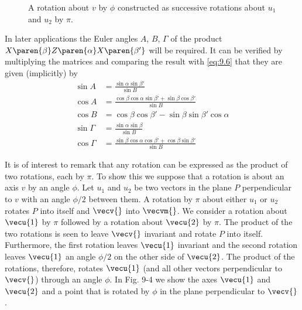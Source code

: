 \begin{figure}[htbp] %
   \centering
   \caption{A rotation about $v$ by $\phi$ constructed as successive rotations about $u_{1}$ and $u_{2}$ by $\pi$.}
   \label{fig:9.4}
\end{figure}

In later applications the Euler angles $A$, $B$,  $\Gamma$ of the product $X\paren{\beta} Z\paren{\alpha} X\paren{\beta'} $ will be required. It can be verified by multiplying the matrices and comparing the result with \eqref{eq:9.6} that they are given (implicitly) by
\begin{subequations}
\label{eq:9.9} 
\begin{align} 
%
\sin A &= \frac{ \sin \alpha \sin \beta'} { \sin B } \\ 
%
\cos A &= \frac{ \cos \beta \cos \alpha \sin \beta' + \sin \beta \cos \beta'} { \sin B } \\ 
%
\cos B &= \cos \beta \cos \beta' - \sin \beta \sin \beta' \cos \alpha \\ 
%
\sin \Gamma &= \frac{ \sin \alpha \sin \beta } { \sin B } \\ 
%
\cos \Gamma &= \frac{ \sin \beta \cos \alpha \cos \beta' + \cos \beta \sin \beta'} { \sin B } 
%
\end{align}
\end{subequations}

It is of interest to remark that any rotation can be expressed as the product of two rotations, each by $\pi$. To show this we suppose that a rotation is about an axis $v$ by an angle $\phi$. Let $u_{1}$ and $u_{2}$ be two vectors in the plane $P$ perpendicular to $v$ with an angle $\phi/2$ between them. A rotation by $\pi$ about either $u_{1}$ or $u_{2}$ rotates $P$ into itself and $\vecv{}$ into $\vecvm{}$. We consider a rotation about $\vecu{1}$ by $\pi$ followed by a rotation about $\vecu{2}$ by $\pi$.	The product of the two rotations is seen to leave $\vecv{}$ invariant and rotate $P$ into itself. Furthermore, the first rotation leaves $\vecu{1}$ invariant and the second rotation leaves $\vecu{1}$ an angle $\phi/2$ on the other side of $\vecu{2}$. The product of the rotations, therefore, rotates $\vecu{1}$ (and all other vectors perpendicular to $\vecv{}$) through an angle $\phi$. In Fig. 9-4 we show the axes $\vecu{1}$ and $\vecu{2}$ and a point that is rotated by $\phi$ in the plane perpendicular to $\vecv{}$.

